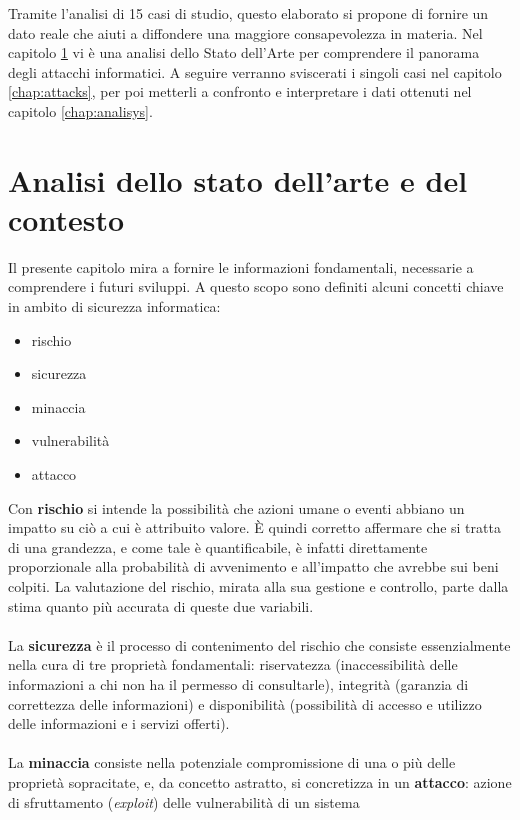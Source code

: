 \documentclass[12pt,a4paper,openright,twoside]{report}
\begin{document}
Tramite l'analisi di 15 casi di studio, questo elaborato si propone di fornire un dato reale che aiuti a diffondere una 
maggiore consapevolezza in materia. Nel capitolo \ref{chap:artState} vi \`e una analisi dello Stato dell'Arte per 
comprendere il panorama degli attacchi informatici. A seguire verranno sviscerati i singoli casi nel capitolo 
\ref{chap:attacks}, per poi metterli a confronto e interpretare i dati ottenuti nel capitolo \ref{chap:analisys}.\\ 

\clearpage{\pagestyle{empty}\cleardoublepage}



\chapter{Analisi dello stato dell'arte e del contesto}\label{chap:artState}
Il presente capitolo mira a fornire le informazioni fondamentali, necessarie a comprendere i futuri sviluppi. A questo scopo sono definiti alcuni concetti chiave in ambito di sicurezza informatica:
\begin{itemize}
    \item rischio
    \item sicurezza
    \item minaccia
    \item vulnerabilit\`a
    \item attacco
\end{itemize}
Con \textbf{rischio} si intende la possibilit\`a che azioni umane o eventi  abbiano un impatto su ci\`o a cui \`e attribuito valore. \`E quindi corretto affermare che si tratta di una grandezza, e come tale \`e quantificabile, \`e infatti direttamente proporzionale alla probabilit\`a di avvenimento e all'impatto che avrebbe sui beni colpiti. La valutazione del rischio, mirata alla sua gestione e controllo, parte dalla stima quanto pi\`u accurata di queste due variabili.\\
\\
La \textbf{sicurezza} \`e il processo di contenimento del rischio che consiste essenzialmente nella cura di tre propriet\`a fondamentali: riservatezza (inaccessibilit\`a delle informazioni a chi non ha il permesso di consultarle), integrit\`a (garanzia di correttezza delle informazioni) e disponibilit\`a (possibilit\`a di accesso e utilizzo delle informazioni e i servizi offerti).\\
\\
La \textbf{minaccia} consiste nella potenziale compromissione di una o pi\`u delle propriet\`a sopracitate, e, da concetto astratto, si concretizza in un \textbf{attacco}: azione di sfruttamento (\textit{exploit}) delle vulnerabilit\`a di un sistema\\
\end{document}
